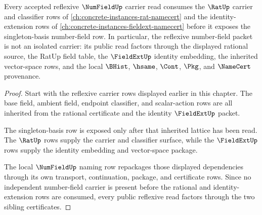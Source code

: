 \begin{theorem}
\label{thm:numfield-reflexive-dependency-lattice}
Every accepted reflexive $\NumFieldUp$ carrier read consumes the $\RatUp$ carrier and classifier rows of \autoref{ch:concrete-instances-rat-namecert} and the identity-extension rows of \autoref{ch:concrete-instances-fieldext-namecert} before it exposes the singleton-basis number-field row. In particular, the reflexive number-field packet is not an isolated carrier: its public read factors through the displayed rational source, the RatUp field table, the $\FieldExtUp$ identity embedding, the inherited vector-space rows, and the local $\BHist$, $\hsame$, $\Cont$, $\Pkg$, and $\NameCert$ provenance.
\end{theorem}
\begin{proof}
Start with the reflexive carrier rows displayed earlier in this chapter. The base field, ambient field, endpoint classifier, and scalar-action rows are all inherited from the rational certificate and the identity $\FieldExtUp$ packet.

The singleton-basis row is exposed only after that inherited lattice has been read. The $\RatUp$ rows supply the carrier and classifier surface, while the $\FieldExtUp$ rows supply the identity embedding and vector-space package.

The local $\NumFieldUp$ naming row repackages those displayed dependencies through its own transport, continuation, package, and certificate rows. Since no independent number-field carrier is present before the rational and identity-extension rows are consumed, every public reflexive read factors through the two sibling certificates.
\end{proof}
